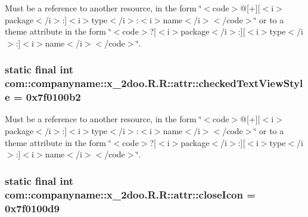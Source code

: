 Must be a reference to another resource, in the form \char`\"{}$<$code$>$@\mbox{[}+\mbox{]}\mbox{[}$<$i$>$package$<$/i$>$:\mbox{]}$<$i$>$type$<$/i$>$:$<$i$>$name$<$/i$>$$<$/code$>$\char`\"{} or to a theme attribute in the form \char`\"{}$<$code$>$?\mbox{[}$<$i$>$package$<$/i$>$:\mbox{]}\mbox{[}$<$i$>$type$<$/i$>$:\mbox{]}$<$i$>$name$<$/i$>$$<$/code$>$\char`\"{}. \hypertarget{classcom_1_1companyname_1_1x__2doo_1_1_r_1_1attr_b28d2f6fb5e0102cab1f1b4f30877075}{
\subsubsection[{checkedTextViewStyle}]{\setlength{\rightskip}{0pt plus 5cm}static final int com::companyname::x\_\-2doo.R.R::attr::checkedTextViewStyle = 0x7f0100b2}}
\label{classcom_1_1companyname_1_1x__2doo_1_1_r_1_1attr_b28d2f6fb5e0102cab1f1b4f30877075}


Must be a reference to another resource, in the form \char`\"{}$<$code$>$@\mbox{[}+\mbox{]}\mbox{[}$<$i$>$package$<$/i$>$:\mbox{]}$<$i$>$type$<$/i$>$:$<$i$>$name$<$/i$>$$<$/code$>$\char`\"{} or to a theme attribute in the form \char`\"{}$<$code$>$?\mbox{[}$<$i$>$package$<$/i$>$:\mbox{]}\mbox{[}$<$i$>$type$<$/i$>$:\mbox{]}$<$i$>$name$<$/i$>$$<$/code$>$\char`\"{}. \hypertarget{classcom_1_1companyname_1_1x__2doo_1_1_r_1_1attr_06ea3e8c4d93a289db4a83a950c2b7e6}{
\subsubsection[{closeIcon}]{\setlength{\rightskip}{0pt plus 5cm}static final int com::companyname::x\_\-2doo.R.R::attr::closeIcon = 0x7f0100d9}}
\label{classcom_1_1companyname_1_1x__2doo_1_1_r_1_1attr_06ea3e8c4d93a289db4a83a950c2b7e6}


